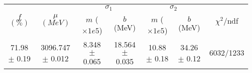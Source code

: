 \begin{tabular}{c|c|cc|cc||c}
 \multirow{2}{*}{$f$ $(\%)$} & \multirow{2}{*}{$\mu$ $(MeV)$} & \multicolumn{2}{|c|}{$\sigma_1$} & \multicolumn{2}{|c||}{$\sigma_2$} & \multirow{2}{*}{$\chi^2/$ndf} \\
 & & $m$ ($\times1e5$) & $b$ (MeV) & $m$ ($\times1e5$) & $b$ (MeV) & \\
\hline
71.98 $\pm$ 0.19 & 3096.747 $\pm$ 0.012 & 8.348 $\pm$ 0.065 & 18.564 $\pm$ 0.035 & 10.88 $\pm$ 0.18 & 34.26 $\pm$ 0.12 & 6032/1233\\
\end{tabular}

